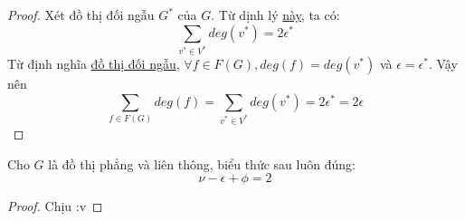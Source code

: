 \begin{proof}
    Xét đồ thị đối ngẫu $G^*$ của $G$. Từ dịnh lý \hyperref[thr:v2e]{này}, ta có:
    $$\sum_{v^* \in V^*}deg(v^*) = 2\epsilon^*$$
    Từ định nghĩa \hyperref[def:dualgraph]{đồ thị đối ngẫu}, $\forall f \in F(G), deg(f)=deg(v^*)$ và $\epsilon = \epsilon^*$. Vậy nên
    $$\sum_{f \in F(G)}deg(f) = \sum_{v^* \in V^*}deg(v^*) = 2\epsilon^* = 2\epsilon$$
\end{proof}
\begin{theorem}
    Cho $G$ là đồ thị phẳng và liên thông, biểu thức sau luôn đúng: $$\nu -\epsilon+\phi=2$$
\end{theorem}
\begin{proof}
    Chịu :v
\end{proof}






